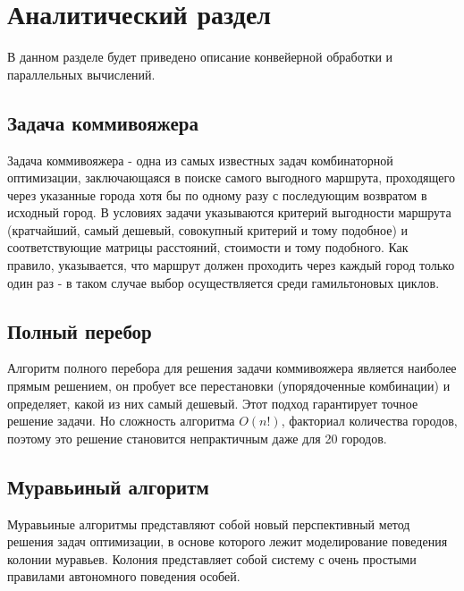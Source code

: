 \chapter{Аналитический раздел}
\label{cha:analysis}

В данном разделе будет приведено описание
конвейерной обработки и параллельных вычислений.


\section{Задача коммивояжера}

Задача коммивояжера - одна из самых известных задач комбинаторной оптимизации, заключающаяся в поиске самого выгодного маршрута, проходящего через указанные города хотя бы по одному разу с последующим возвратом в исходный город. В условиях задачи указываются критерий выгодности маршрута (кратчайший, самый дешевый, совокупный критерий и тому подобное) и соответствующие матрицы расстояний, стоимости и тому подобного. Как правило, указывается, что маршрут должен проходить через каждый город только один раз - в таком случае выбор осуществляется среди гамильтоновых циклов.

\section{Полный перебор}

Алгоритм полного перебора для решения задачи коммивояжера
является наиболее прямым решением, он пробует все перестановки (упорядоченные комбинации) и определяет, какой из них самый дешевый.
Этот подход гарантирует точное решение задачи.
Но сложность алгоритма $O(n!)$, факториал количества городов, поэтому это решение становится непрактичным даже для 20 городов.

\section{Муравьиный алгоритм}

Муравьиные алгоритмы представляют собой новый перспективный метод решения задач оптимизации,
в основе которого лежит моделирование поведения колонии муравьев.
Колония представляет собой систему с очень простыми правилами автономного поведения особей.

